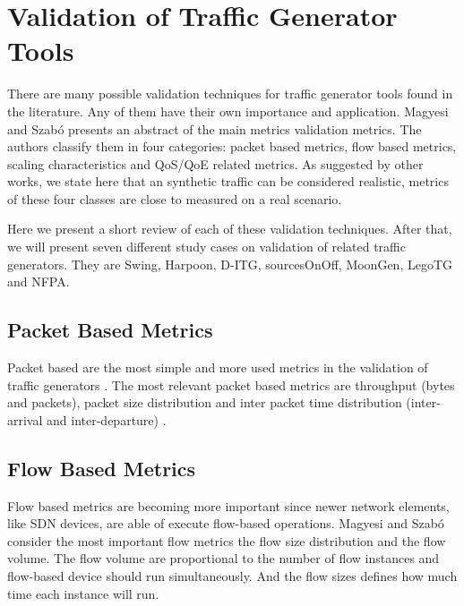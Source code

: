 \section{Validation of Traffic Generator Tools}

There are many possible validation techniques for traffic generator tools found in the literature. Any of them have their own importance and application. Magyesi and Szabó\cite{validate-trafficgen} presents an abstract of the main metrics validation metrics. The authors classify them in four categories: packet based metrics, flow based metrics, scaling characteristics and QoS/QoE related metrics. As suggested by other works\cite{swing-paper}, we state here that an synthetic traffic can be considered realistic, metrics of these four classes are close to measured on a real scenario.

Here we present a short review of each of these validation techniques. After that, we will present seven different study cases on validation of related traffic generators. They are Swing\cite{swing-paper}, Harpoon\cite{harpoon-paper}, D-ITG\cite{ditg-paper}, sourcesOnOff\cite{sourcesonoff-paper}, MoonGen\cite{moongen-paper}, LegoTG\cite{legotg-paper} and NFPA\cite{nfpa-paper}.


\subsection{Packet Based Metrics}

Packet based are the most simple and more used metrics in the validation of traffic generators \cite{validate-trafficgen}. The most relevant packet based metrics are throughput\cite{do-you-trust}\cite{comparative-trafficgen-tools}\cite{performance-trafficgen}\cite{moongen-paper} (bytes and packets), packet size distribution\cite{packet-distribution-model} and inter packet time distribution (inter-arrival and inter-departure) \cite{sourcesonoff-paper} \cite{ditg-paper}.       


\subsection{Flow Based Metrics}

Flow based metrics are becoming more important since newer network elements, like SDN devices, are able of execute flow-based operations\cite{validate-trafficgen}\cite{sdn-survey}. Magyesi and Szabó\cite{validate-trafficgen} consider the most important flow metrics the flow size distribution and the flow volume. The flow volume are proportional to the number of flow instances and flow-based device should run simultaneously. And the flow sizes defines how much time each instance will run.


